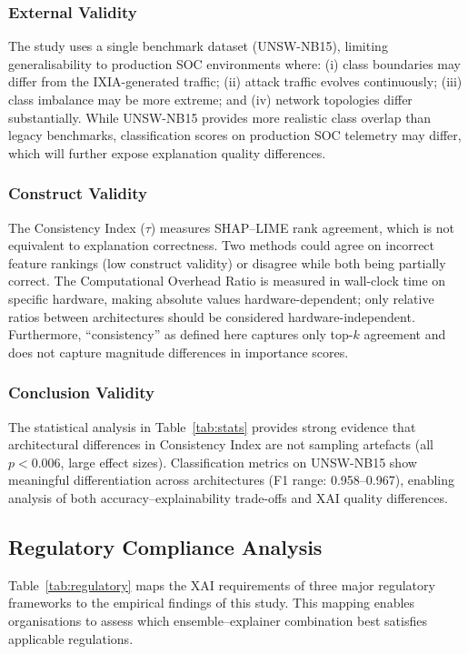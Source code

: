 \documentclass[conference]{IEEEtran}
\begin{document}
\subsubsection{External Validity}
The study uses a single benchmark dataset (UNSW-NB15), limiting generalisability to production SOC environments where: (i) class boundaries may differ from the IXIA-generated traffic; (ii) attack traffic evolves continuously; (iii) class imbalance may be more extreme; and (iv) network topologies differ substantially. While UNSW-NB15 provides more realistic class overlap than legacy benchmarks, classification scores on production SOC telemetry may differ, which will further expose explanation quality differences.

\subsubsection{Construct Validity}
The Consistency Index ($\tau$) measures SHAP--LIME rank agreement, which is not equivalent to explanation correctness. Two methods could agree on incorrect feature rankings (low construct validity) or disagree while both being partially correct. The Computational Overhead Ratio is measured in wall-clock time on specific hardware, making absolute values hardware-dependent; only relative ratios between architectures should be considered hardware-independent. Furthermore, ``consistency'' as defined here captures only top-$k$ agreement and does not capture magnitude differences in importance scores.

\subsubsection{Conclusion Validity}
The statistical analysis in Table~\ref{tab:stats} provides strong evidence that architectural differences in Consistency Index are not sampling artefacts (all $p < 0.006$, large effect sizes). Classification metrics on UNSW-NB15 show meaningful differentiation across architectures (F1 range: 0.958--0.967), enabling analysis of both accuracy--explainability trade-offs and XAI quality differences.

\subsection{Regulatory Compliance Analysis}

Table~\ref{tab:regulatory} maps the XAI requirements of three major regulatory frameworks to the empirical findings of this study. This mapping enables organisations to assess which ensemble--explainer combination best satisfies applicable regulations.
\end{document}
